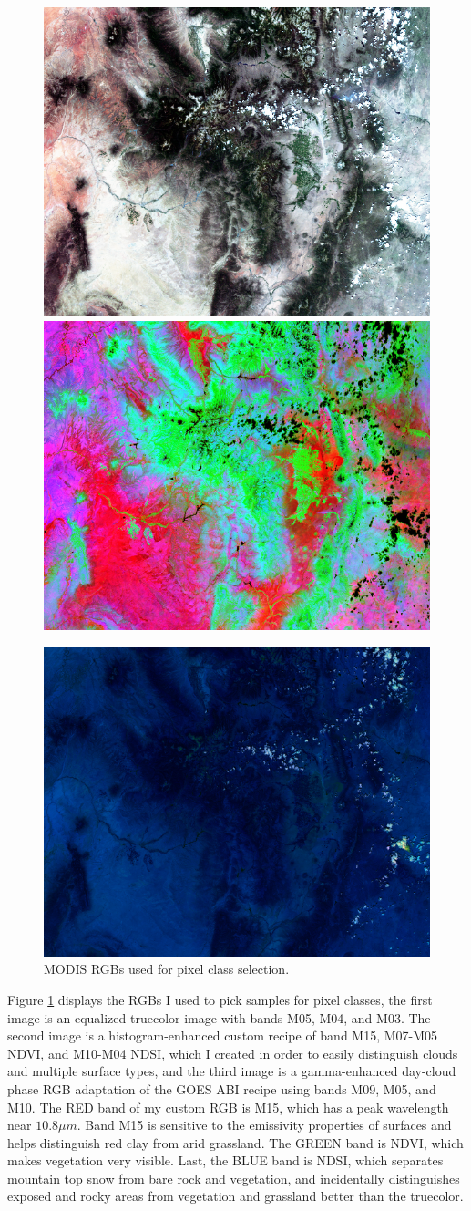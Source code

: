 \documentclass[12pt]{article}
\begin{document}
\begin{figure}[h!]
    \centering
    \includegraphics[width=.48\linewidth]{figures/p3/selectionRGB_M05-M04-M03_tcEQ.png}
    \includegraphics[width=.48\linewidth]{figures/p3/selectionRGB_M15-NDVI-NDSI_custom.png}

    \vspace{.2em}
    \includegraphics[width=.48\linewidth]{figures/p3/selectionRGB_M09-M05-M10_dcp.png}
    \caption{MODIS RGBs used for pixel class selection.}
    \label{p3_selection_rgbs}
\end{figure}

Figure \ref{p3_selection_rgbs} displays the RGBs I used to pick samples for pixel classes, the first image is an equalized truecolor image with bands M05, M04, and M03. The second image is a histogram-enhanced custom recipe of band M15, M07-M05 NDVI, and M10-M04 NDSI, which I created in order to easily distinguish clouds and multiple surface types, and the third image is a gamma-enhanced day-cloud phase RGB adaptation of the GOES ABI recipe using bands M09, M05, and M10. The RED band of my custom RGB is M15, which has a peak wavelength near $10.8\mu m$. Band M15 is sensitive to the emissivity properties of surfaces and helps distinguish red clay from arid grassland. The GREEN band is NDVI, which makes vegetation very visible. Last, the BLUE band is NDSI, which separates mountain top snow from bare rock and vegetation, and incidentally distinguishes exposed and rocky areas from vegetation and grassland better than the truecolor.
\end{document}
